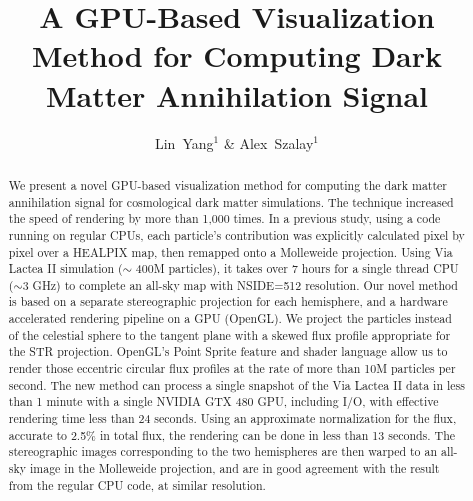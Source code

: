 \documentclass[11pt,twoside]{article}
\begin{document}
\title{A GPU-Based Visualization Method for Computing Dark Matter Annihilation Signal}
\author{Lin~Yang$^1$ \& Alex~Szalay$^1$
}

\begin{abstract}
We present a novel GPU-based visualization method for computing the dark matter annihilation signal for cosmological dark matter simulations. The technique increased the speed of rendering by more than 1,000 times. In a previous study, using a code running on regular CPUs, each particle's contribution was explicitly calculated pixel by pixel over a HEALPIX map, then remapped onto a Molleweide projection. Using Via Lactea II simulation ($\sim$ 400M particles), it takes over 7 hours for a single thread CPU ($\sim$3 GHz) to complete an all-sky map with  NSIDE=512 resolution. Our novel method is based on a separate stereographic projection for each hemisphere, and a hardware accelerated rendering pipeline on a GPU (OpenGL). We project the particles instead of the celestial sphere to the tangent plane with a skewed flux profile appropriate for the STR projection. OpenGL's Point Sprite feature and shader language allow us to render those eccentric circular flux profiles at the rate of more than 10M particles per second. The new method can process a single snapshot of the Via Lactea II data in less than 1 minute with a single NVIDIA GTX 480 GPU, including I/O, with effective rendering time less than 24 seconds. Using an approximate normalization for the flux, accurate to 2.5\% in total flux, the rendering can be done in less than 13 seconds. The stereographic images corresponding to the two hemispheres are then warped to an all-sky image in the Molleweide projection, and are in good agreement with the result from the regular CPU code, at similar resolution.

\end{abstract}
\end{document}
